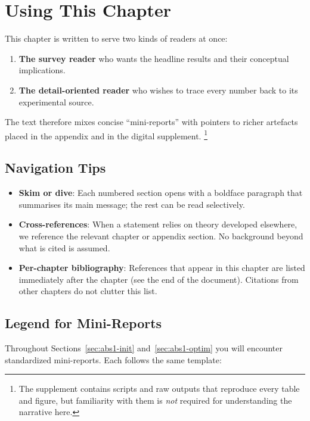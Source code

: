 ﻿%
\section{Using This Chapter}
\label{sec:abs1-using}

This chapter is written to serve two kinds of readers at once:

\begin{enumerate}
    \item \textbf{The survey reader} who wants the headline results and their
          conceptual implications.
    \item \textbf{The detail-oriented reader} who wishes to trace every number
          back to its experimental source.
\end{enumerate}

\noindent
The text therefore mixes concise “mini-reports” with pointers to richer
artefacts placed in the appendix and in the digital supplement.%
\footnote{The supplement contains scripts and raw outputs that reproduce every
table and figure, but familiarity with them is \emph{not} required for
understanding the narrative here.}

\subsection*{Navigation Tips}

\begin{itemize}
    \item \textbf{Skim or dive}: Each numbered section opens with a boldface
          paragraph that summarises its main message; the rest can be read
          selectively.
    \item \textbf{Cross-references}: When a statement relies on theory developed
          elsewhere, we reference the relevant chapter or appendix section.  No
          background beyond what is cited is assumed.
    \item \textbf{Per-chapter bibliography}: References that appear in this
          chapter are listed immediately after the chapter (see the end of the
          document).  Citations from other chapters do not clutter this list.
\end{itemize}

\subsection*{Legend for Mini-Reports}

Throughout Sections~\ref{sec:abs1-init} and~\ref{sec:abs1-optim} you will
encounter standardized mini-reports.  Each follows the same template:

